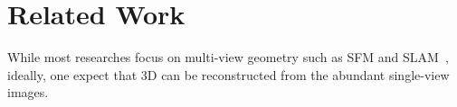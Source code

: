 \documentclass[10pt,twocolumn,letterpaper]{article}
\newcommand{\cmt}[2]{[#1: #2]}
\newcommand{\todo}[1]{\cmt{{\bf TODO}}{{\bf \color{blue} #1}}}
\begin{document}
\section{Related Work}
\label{sec:related}%
While most researches focus on multi-view geometry such as SFM and SLAM~\cite{haming2010structure, fuentes2015visual}, ideally, one expect that 3D can be reconstructed from the abundant single-view images. 
\end{document}
